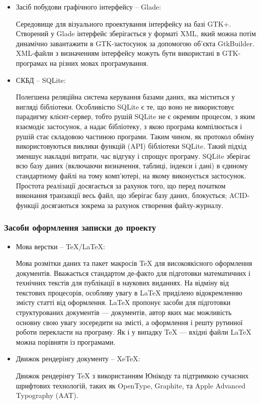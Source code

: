 \begin{itemize}[label=\Large$\diamond$]
  \item Засіб побудови графічного інтерфейсу -- Glade:

    Середовище для візуального проектування інтерфейсу на базі GTK+. Створений у Glade інтерфейс зберігається у форматі XML, який можна потім динамічно завантажити в GTK-застосунок за допомогою об'єкта GtkBuilder. XML-файли з визначенням інтерфейсу можуть бути використані в GTK-програмах на різних мовах програмування.

  \item СКБД -- SQLite:

    Полегшена реляційна система керування базами даних, яка міститься у вигляді бібліотеки. Особливістю SQLite є те, що воно не використовує парадигму клієнт-сервер, тобто рушій SQLite не є окремим процесом, з яким взаємодіє застосунок, а надає бібліотеку, з якою програма компілюється і рушій стає складовою частиною програми. Таким чином, як протокол обміну використовуються виклики функцій (API) бібліотеки SQLite. Такий підхід зменшує накладні витрати, час відгуку і спрощує програму. SQLite зберігає всю базу даних (включаючи визначення, таблиці, індекси і дані) в єдиному стандартному файлі на тому комп'ютері, на якому виконується застосунок. Простота реалізації досягається за рахунок того, що перед початком виконання транзакції весь файл, що зберігає базу даних, блокується; ACID-функції досягаються зокрема за рахунок створення файлу-журналу.

\end{itemize}

\subsubsection{Засоби оформлення записки до проекту}
\begin{itemize}[label=\Large$\diamond$]\itemsep1em
  \item Мова верстки -- TeX/LaTeX:

    Мова розмітки даних та пакет макросів TeX для високоякісного оформлення документів. Вважається стандартом де-факто для підготовки математичних і технічних текстів для публікації в наукових виданнях.
    На відміну від текстових процесорів, особливу увагу в LaTeX приділено відокремленню змісту статті від оформлення. LaTeX пропонує засоби для підготовки структурованих документів — документів, автор яких має можливість основну свою увагу зосередити на змісті, а оформлення і решту рутинної роботи перекласти на програму. Як і у випадку TeX — вхідні файли LaTeX можна порівняти із програмами.

  \item Движок рендерінгу документу -- XeTeX:

    Движок рендерінгу TeX з використанням Юнікоду та підтримкою сучасних шрифтових технологій, таких як OpenType, Graphite, та Apple Advanced Typography (AAT).
\end{itemize}

